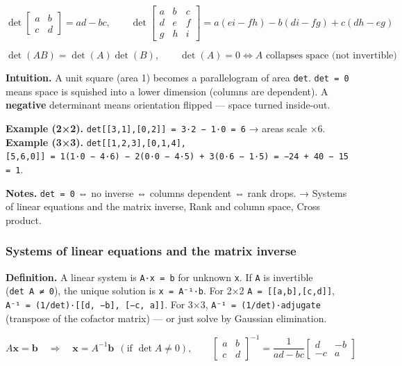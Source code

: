 \documentclass[
  10pt,
  letterpaper,
  onecolumn]{article}
\begin{document}
\begin{equation*}
\det\begin{bmatrix}a&b\\c&d\end{bmatrix}=ad-bc,
\qquad
\det\begin{bmatrix}a&b&c\\d&e&f\\g&h&i\end{bmatrix}=a(ei-fh)-b(di-fg)+c(dh-eg)
\end{equation*}

\begin{equation*}
\det(AB)=\det(A)\det(B),
\qquad
\det(A)=0 \iff A \text{ collapses space (not invertible)}
\end{equation*}

\textbf{Intuition.} A unit square (area 1) becomes a parallelogram of
area \texttt{\textbar{}det\textbar{}}. \texttt{det\ =\ 0} means space is
squished into a lower dimension (columns are dependent). A
\textbf{negative} determinant means orientation flipped --- space turned
inside-out.

\textbf{Example (2×2).}
\texttt{det{[}{[}3,1{]},{[}0,2{]}{]}\ =\ 3·2\ −\ 1·0\ =\ 6} → areas
scale ×6. \textbf{Example (3×3).}
\texttt{det{[}{[}1,2,3{]},{[}0,1,4{]},{[}5,6,0{]}{]}\ =\ 1(1·0\ −\ 4·6)\ −\ 2(0·0\ −\ 4·5)\ +\ 3(0·6\ −\ 1·5)\ =\ −24\ +\ 40\ −\ 15\ =\ 1}.

\textbf{Notes.} \texttt{det\ =\ 0} ⇔ no inverse ⇔ columns dependent ⇔
rank drops. → Systems of linear equations and the matrix inverse, Rank
and column space, Cross product.

\hypertarget{systems-of-linear-equations-and-the-matrix-inverse}{%
\subsubsection{Systems of linear equations and the matrix
inverse}\label{systems-of-linear-equations-and-the-matrix-inverse}}

\textbf{Definition.} A linear system is \texttt{A·x\ =\ b} for unknown
\texttt{x}. If \texttt{A} is invertible (\texttt{det\ A\ ≠\ 0}), the
unique solution is \texttt{x\ =\ A⁻¹·b}. For 2×2
\texttt{A\ =\ {[}{[}a,b{]},{[}c,d{]}{]}},
\texttt{A⁻¹\ =\ (1/det)·{[}{[}d,\ −b{]},\ {[}−c,\ a{]}{]}}. For 3×3,
\texttt{A⁻¹\ =\ (1/det)·adjugate} (transpose of the cofactor matrix) ---
or just solve by Gaussian elimination.

\begin{equation*}
A\mathbf{x}=\mathbf{b}
\quad\Longrightarrow\quad
\mathbf{x}=A^{-1}\mathbf{b}\ \ (\text{if }\det A\ne 0),
\qquad
\begin{bmatrix}a&b\\c&d\end{bmatrix}^{-1}=\frac{1}{ad-bc}\begin{bmatrix}d&-b\\-c&a\end{bmatrix}
\end{equation*}
\end{document}
